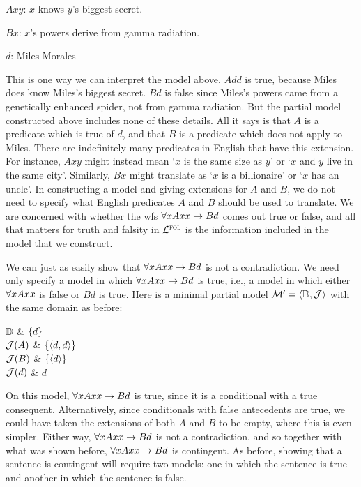 \begin{ekey}[leftmargin=.7in]
  \item[$Axy$:] $x$ knows $y$'s biggest secret.
  \item[$Bx$:] $x$'s powers derive from gamma radiation.
  \item[$d$:] Miles Morales
\end{ekey}

This is one way we can interpret the model above.
$Add$ is true, because Miles does know Miles's biggest secret.
$Bd$ is false since Miles's powers came from a genetically enhanced spider, not from gamma radiation.
But the partial model constructed above includes none of these details.
All it says is that $A$ is a predicate which is true of $d$, and that $B$ is a predicate which does not apply to Miles.
There are indefinitely many predicates in English that have this extension.
For instance, $Axy$ might instead mean `$x$ is the same size as $y$' or `$x$ and $y$ live in the same city'.
Similarly, $Bx$ might translate as `$x$ is a billionaire' or `$x$ has an uncle'.
In constructing a model and giving extensions for $A$ and $B$, we do not need to specify what English predicates $A$ and $B$ should be used to translate.
We are concerned with whether the wfs $\forall xAxx \rightarrow Bd$ comes out true or false, and all that matters for truth and falsity in $\mathcal{L}^{\textsc{fol}}$ is the information included in the model that we construct.

We can just as easily show that $\forall xAxx \rightarrow Bd$ is not a contradiction.
We need only specify a model in which $\forall xAxx \rightarrow Bd$ is true, i.e., a model in which either $\forall x Axx$ is false or $Bd$ is true.
Here is a minimal partial model $\mathcal{M}'=\langle\mathbb{D},\mathcal{J}\rangle$ with the same domain as before:

\begin{partialmodel}
  $\mathbb{D}$			& $\lbrace d\rbrace$\\
	$\mathcal{J}(A)$ 	& $\lbrace\langle d,d\rangle\rbrace$\\
  $\mathcal{J}(B)$	  & $\lbrace\langle d\rangle\rbrace$\\
	$\mathcal{J}(d)$	  & $d$
\end{partialmodel}

On this model, $\forall xAxx \rightarrow Bd$ is true, since it is a conditional with a true consequent.
Alternatively, since conditionals with false antecedents are true, we could have taken the extensions of both $A$ and $B$ to be empty, where this is even simpler. 
Either way, $\forall xAxx \rightarrow Bd$ is not a contradiction, and so together with what was shown before, $\forall xAxx \rightarrow Bd$ is contingent.
As before, showing that a sentence is contingent will require two models: one in which the sentence is true and another in which the sentence is false.


